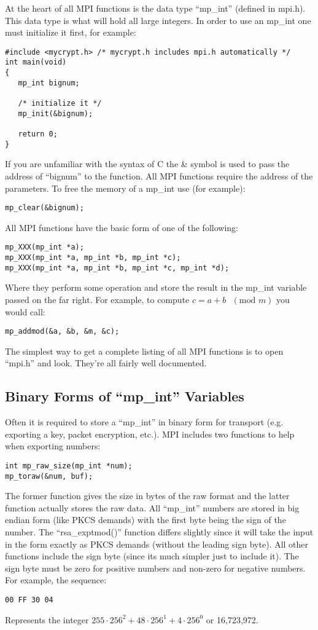 \documentclass{book}
\begin{document}
At the heart of all MPI functions is the data type ``mp\_int'' (defined in mpi.h).  This data type is what will hold all large
integers.  In order to use an mp\_int one must initialize it first, for example:
\begin{verbatim}
#include <mycrypt.h> /* mycrypt.h includes mpi.h automatically */
int main(void)
{ 
   mp_int bignum;
   
   /* initialize it */
   mp_init(&bignum);

   return 0;
}
\end{verbatim}
If you are unfamiliar with the syntax of C the \& symbol is used to pass the address of ``bignum'' to the function.  All
MPI functions require the address of the parameters.  To free the memory of a mp\_int use (for example):
\begin{verbatim}
mp_clear(&bignum);
\end{verbatim}

All MPI functions have the basic form of one of the following:
\begin{verbatim}
mp_XXX(mp_int *a);
mp_XXX(mp_int *a, mp_int *b, mp_int *c);
mp_XXX(mp_int *a, mp_int *b, mp_int *c, mp_int *d);
\end{verbatim}

Where they perform some operation and store the result in the mp\_int variable passed on the far right.  For example, to
compute $c = a + b \mbox{ }(\mbox{mod }m)$ you would call:
\begin{verbatim}
mp_addmod(&a, &b, &m, &c);
\end{verbatim}

The simplest way to get a complete listing of all MPI functions is to open ``mpi.h'' and look.  They're all fairly 
well documented.

\subsection{Binary Forms of ``mp\_int'' Variables}

Often it is required to store a ``mp\_int'' in binary form for transport (e.g. exporting a key, packet encryption, etc.).
MPI includes two functions to help when exporting numbers:
\begin{verbatim}
int mp_raw_size(mp_int *num);
mp_toraw(&num, buf);
\end{verbatim}

The former function gives the size in bytes of the raw format and the latter function actually stores the raw data.  All
``mp\_int'' numbers are stored in big endian form (like PKCS demands) with the first byte being the sign of the number.  The
``rsa\_exptmod()'' function differs slightly since it will take the input in the form exactly as PKCS demands (without the
leading sign byte).  All other functions include the sign byte (since its much simpler just to include it).  The sign byte
must be zero for positive numbers and non-zero for negative numbers.  For example,
the sequence:
\begin{verbatim}
00 FF 30 04
\end{verbatim}
Represents the integer $255 \cdot 256^2 + 48 \cdot 256^1 + 4 \cdot 256^0$ or 16,723,972.
\end{document}
